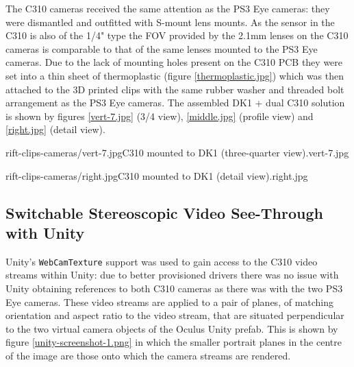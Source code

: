 The C310 cameras received the same attention as the PS3 Eye cameras: they were dismantled and outfitted with S-mount lens mounts. As the sensor in the C310 is also of the 1/4" type the FOV provided by the 2.1mm lenses on the C310 cameras is comparable to that of the same lenses mounted to the PS3 Eye cameras. Due to the lack of mounting holes present on the C310 PCB they were set into a thin sheet of thermoplastic (figure \ref{thermoplastic.jpg}) which was then attached to the 3D printed clips with the same rubber washer and threaded bolt arrangement as the PS3 Eye cameras. The assembled DK1 + dual C310 solution is shown by figures \ref{vert-7.jpg} (3/4 view), \ref{middle.jpg} (profile view) and \ref{right.jpg} (detail view).

       {rift-clips-cameras/vert-7.jpg}{C310 mounted to DK1 (three-quarter view).}{vert-7.jpg}

       {rift-clips-cameras/right.jpg}{C310 mounted to DK1 (detail view).}{right.jpg}


\subsection{Switchable Stereoscopic Video See-Through with Unity}

Unity's \texttt{WebCamTexture} support was used to gain access to the C310 video streams within Unity: due to better provisioned drivers there was no issue with Unity obtaining references to both C310 cameras as there was with the two PS3 Eye cameras. These video streams are applied to a pair of planes, of matching orientation and aspect ratio to the video stream, that are situated perpendicular to the two virtual camera objects of the Oculus Unity prefab. This is shown by figure \ref{unity-screenshot-1.png} in which the smaller portrait planes in the centre of the image are those onto which the camera streams are rendered.

